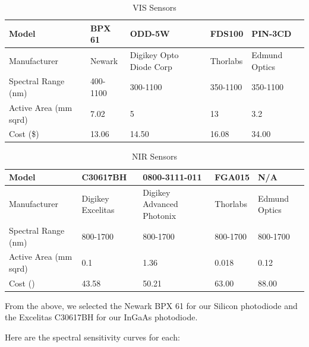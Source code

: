 \begin{table}[H]
	\centering
	\label{table:VISsensors}
	\caption{VIS Sensors}
	\begin{tabular}{|p{2cm}|l|l|l|l|}
	\hline    
	Model & BPX 61 & ODD-5W & FDS100 & PIN-3CD\\
    \hline
	Manufacturer & Newark & Digikey Opto Diode Corp & Thorlabs & Edmund Optics\\
    \hline
	Spectral Range (nm) & 400-1100 & 300-1100 & 350-1100 & 350-1100\\
    \hline
	Active Area (mm sqrd) & 7.02 & 5 & 13 & 3.2\\
    \hline
	Cost (\$) & 13.06 & 14.50 & 16.08 & 34.00\\
    \hline
	\end{tabular}
\end{table}



\begin{table}[H]
	\centering
	\label{table:NIRsensors}
	\caption{NIR Sensors}
	\begin{tabular}{|p{2cm}|l|l|l|l|}
	\hline    
	Model & C30617BH & 0800-3111-011 & FGA015 & N/A\\
	\hline
	Manufacturer & Digikey Excelitas & Digikey Advanced Photonix & Thorlabs & Edmund Optics\\
	\hline
	Spectral Range (nm) & 800-1700 & 800-1700 & 800-1700 & 800-1700\\
	\hline
	Active Area (mm sqrd) & 0.1 & 1.36 & 0.018 & 0.12\\
	\hline
	Cost (\textdollar) & 43.58 & 50.21 & 63.00 & 88.00 \\
	\hline
	\end{tabular}
\end{table}


From the above, we selected the Newark BPX 61 for our Silicon photodiode and the Excelitas C30617BH for our InGaAs photodiode.

Here are the spectral sensitivity curves for each:

